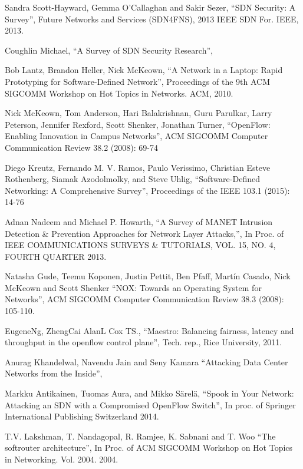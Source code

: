 \begin{thebibliography}{1}

Sandra Scott-Hayward, Gemma O’Callaghan and Sakir Sezer,
``SDN Security: A Survey'', Future Networks and Services (SDN4FNS), 2013 IEEE SDN For. IEEE, 2013.

Coughlin Michael,
``A Survey of SDN Security Research'',

Bob Lantz, Brandon Heller, Nick McKeown,
``A Network in a Laptop: Rapid Prototyping for Software-Defined Network'', Proceedings of the 9th ACM SIGCOMM Workshop on Hot Topics in Networks. ACM, 2010.

Nick McKeown, Tom Anderson, Hari Balakrishnan, Guru Parulkar, Larry Peterson, Jennifer Rexford, Scott Shenker, Jonathan Turner,
``OpenFlow: Enabling Innovation in Campus Networks'', ACM SIGCOMM Computer Communication Review 38.2 (2008): 69-74

Diego Kreutz, Fernando M. V. Ramos, Paulo Verissimo, Christian Esteve Rothenberg, Siamak Azodolmolky, 
and Steve Uhlig,
``Software-Defined Networking: A Comprehensive Survey'', Proceedings of the IEEE 103.1 (2015): 14-76

Adnan Nadeem and Michael P. Howarth,
``A Survey of MANET Intrusion Detection \& Prevention Approaches for Network Layer Attacks,'', In Proc. of IEEE COMMUNICATIONS SURVEYS \& TUTORIALS, VOL. 15, NO. 4, FOURTH QUARTER 2013.

Natasha Gude, Teemu Koponen, Justin Pettit, Ben Pfaff, Martín Casado, Nick McKeown and Scott Shenker
``NOX: Towards an Operating System for Networks'', ACM SIGCOMM Computer Communication Review 38.3 (2008): 105-110.

EugeneNg, ZhengCai AlanL Cox TS.,
``Maestro: Balancing fairness, latency and throughput in the openflow control plane'', Tech. rep., Rice University, 2011.

Anurag Khandelwal, Navendu Jain and Seny Kamara
``Attacking Data Center Networks from the Inside'', 

Markku Antikainen, Tuomas Aura, and Mikko Särelä,
``Spook in Your Network: Attacking an SDN with a Compromised OpenFlow Switch'', In proc. of Springer International Publishing Switzerland 2014.

T.V. Lakshman, T. Nandagopal, R. Ramjee, K. Sabnani and T. Woo
``The softrouter architecture'', In Proc. of ACM SIGCOMM Workshop on Hot Topics in Networking. Vol. 2004. 2004.


\end{thebibliography}
